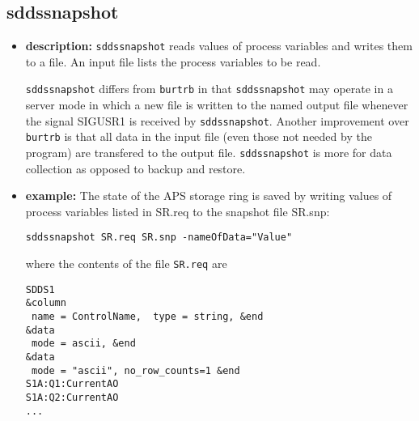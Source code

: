 %
%
\begin{latexonly}
\newpage
\end{latexonly}

%
%
\subsection{sddssnapshot}
\label{sddssnapshot}

\begin{itemize}
\item {\bf description:}
%
%
\verb+sddssnapshot+ reads values of process variables and writes them to a file.
An input file lists the process variables to be read.

\verb+sddssnapshot+ differs from \verb+burtrb+ in that \verb+sddssnapshot+  may operate in a server mode
in which a new file is written to the named output file whenever the signal SIGUSR1 is received 
by \verb+sddssnapshot+.
Another improvement over \verb+burtrb+ is that
all data in the input file (even those not needed by the program) are transfered to the output file.
\verb+sddssnapshot+ is more for data collection as opposed to backup and restore.

\item {\bf example:} 
%
% 
%
The state of the APS storage ring is saved by writing 
values of process variables listed in SR.req
to the snapshot file SR.snp:
\begin{verbatim}
sddssnapshot SR.req SR.snp -nameOfData="Value"
\end{verbatim}
where the contents of the file \verb+SR.req+ are
\begin{verbatim}
SDDS1
&column
 name = ControlName,  type = string, &end
&data
 mode = ascii, &end
&data
 mode = "ascii", no_row_counts=1 &end
S1A:Q1:CurrentAO
S1A:Q2:CurrentAO
...
\end{verbatim}


\end{itemize}
